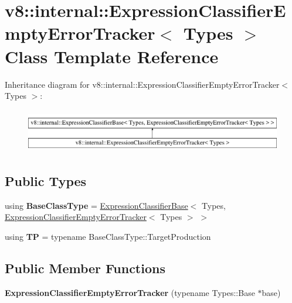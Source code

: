 \hypertarget{classv8_1_1internal_1_1ExpressionClassifierEmptyErrorTracker}{}\section{v8\+:\+:internal\+:\+:Expression\+Classifier\+Empty\+Error\+Tracker$<$ Types $>$ Class Template Reference}
\label{classv8_1_1internal_1_1ExpressionClassifierEmptyErrorTracker}
Inheritance diagram for v8\+:\+:internal\+:\+:Expression\+Classifier\+Empty\+Error\+Tracker$<$ Types $>$\+:\begin{figure}[H]
\begin{center}
\leavevmode
\includegraphics[height=1.934370cm]{classv8_1_1internal_1_1ExpressionClassifierEmptyErrorTracker}
\end{center}
\end{figure}
\subsection*{Public Types}
\begin{DoxyCompactItemize}
\item 
\mbox{\label{classv8_1_1internal_1_1ExpressionClassifierEmptyErrorTracker_a35dd74c999c9b8759ae9d56f69a125c0}} 
using {\bfseries Base\+Class\+Type} = \mbox{\hyperlink{classv8_1_1internal_1_1ExpressionClassifierBase}{Expression\+Classifier\+Base}}$<$ Types, \mbox{\hyperlink{classv8_1_1internal_1_1ExpressionClassifierEmptyErrorTracker}{Expression\+Classifier\+Empty\+Error\+Tracker}}$<$ Types $>$ $>$
\item 
\mbox{\label{classv8_1_1internal_1_1ExpressionClassifierEmptyErrorTracker_a080a6f69a05dc997938a9df14762ea1b}} 
using {\bfseries TP} = typename Base\+Class\+Type\+::\+Target\+Production
\end{DoxyCompactItemize}
\subsection*{Public Member Functions}
\begin{DoxyCompactItemize}
\item 
\mbox{\label{classv8_1_1internal_1_1ExpressionClassifierEmptyErrorTracker_afe5d2fe07d4615d170a0fbc68bb899ec}} 
{\bfseries Expression\+Classifier\+Empty\+Error\+Tracker} (typename Types\+::\+Base $\ast$base)
\end{DoxyCompactItemize}
